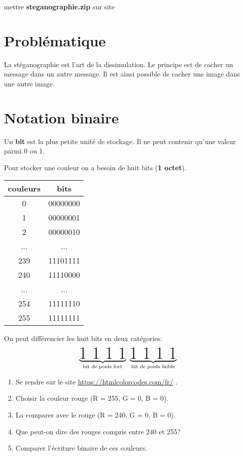 \documentclass[a4paper,11pt]{article}
\begin{document}
\begin{Form}
\begin{commentprof}
mettre \textbf{steganographie.zip} sur site
\end{commentprof}
\section{Problématique}
La stéganographie est l'art de la dissimulation. Le principe est de cacher un message dans un autre message. Il est ainsi possible de cacher une image dans une autre image.
\begin{center}
\end{center}
\section{Notation binaire}
\begin{aretenir}[]
Un \textbf{bit} est la plus petite unité de stockage. Il ne peut contenir qu'une valeur parmi 0 ou 1.
\end{aretenir}
Pour stocker une couleur on a besoin de huit bits (\textbf{1 octet}).
\begin{center}
\begin{tabular}{|c|c|}
\hline 
couleurs & bits \\ 
\hline 
0 & 00000000 \\ 
\hline 
1 & 00000001 \\ 
\hline 
2 & 00000010 \\ 
\hline 
... & ... \\ 
\hline 
239 & 11101111 \\ 
\hline 
240 & 11110000 \\ 
\hline 
... & ... \\ 
\hline 
254 & 11111110 \\ 
\hline
255 & 11111111 \\ 
\hline 
\end{tabular} 
\end{center} 
On peut différencier les huit bits en deux catégories:
$$\underbrace{\text{\Huge{1 1 1 1}}}_{\text{bit de poids fort}}~\underbrace{\text{\Huge{1 1 1 1}}}_{\text{bit de poids faible}}$$
\begin{activite}
\begin{enumerate}
\item Se rendre sur le site \url{https://htmlcolorcodes.com/fr/} .
\item Choisir la couleur rouge (R = 255, G = 0, B = 0).
\item La comparer avec le rouge (R = 240, G = 0, B = 0).
\item Que peut-on dire des rouges compris entre 240 et 255?
\item Comparer l'écriture binaire de ces couleurs.
\end{enumerate}
\end{activite}

\end{Form}
\end{document}
